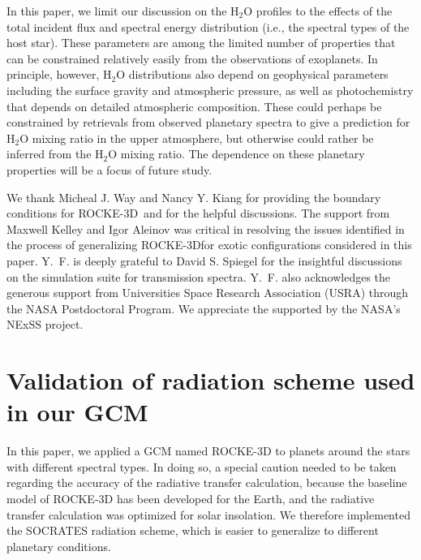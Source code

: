 \documentclass[11pt,numberedappendix,twocolappendix,]{emulateapj}
\def\water{H$_2$O }
\def\modelE{ROCKE-3D}
\begin{document}
In this paper, we limit our discussion on the \water profiles to the effects of the total incident flux and spectral energy distribution (i.e., the spectral types of the host star). 
These parameters are among the limited number of properties that can be constrained relatively easily from the observations of exoplanets. 
In principle, however, \water distributions also depend on geophysical parameters including the surface gravity and atmospheric pressure, as well as photochemistry that depends on detailed atmospheric composition. 
These could perhaps be constrained by retrievals from observed planetary spectra to give a prediction for \water mixing ratio in the upper atmosphere, but  otherwise could rather be inferred from the \water mixing ratio. 
The dependence on these planetary properties will be a focus of future study. 





\acknowledgments
We thank Micheal J. Way and Nancy Y. Kiang for providing the boundary conditions for \modelE \ and for the helpful discussions. 
The support from Maxwell Kelley and Igor Aleinov was critical in resolving the issues identified in the process of generalizing \modelE for exotic configurations considered in this paper. 
Y.~F. is deeply grateful to David S. Spiegel for the insightful discussions on the simulation suite for transmission spectra. 
Y.~F. also acknowledges the generous support from Universities Space Research Association (USRA) through the NASA Postdoctoral Program. 
We appreciate the supported by the NASA's NExSS project. 




\appendix


\section{Validation of radiation scheme used in our GCM}
\label{ap:radiation}

In this paper, we applied a GCM named ROCKE-3D to planets around the stars with different spectral types. 
In doing so, a special caution needed to be taken regarding the accuracy of the radiative transfer calculation, because the baseline model of ROCKE-3D has been developed for the Earth, and the radiative transfer calculation was optimized for solar insolation. 
We therefore implemented the SOCRATES radiation scheme, which is easier to generalize to different planetary conditions.
\end{document}
